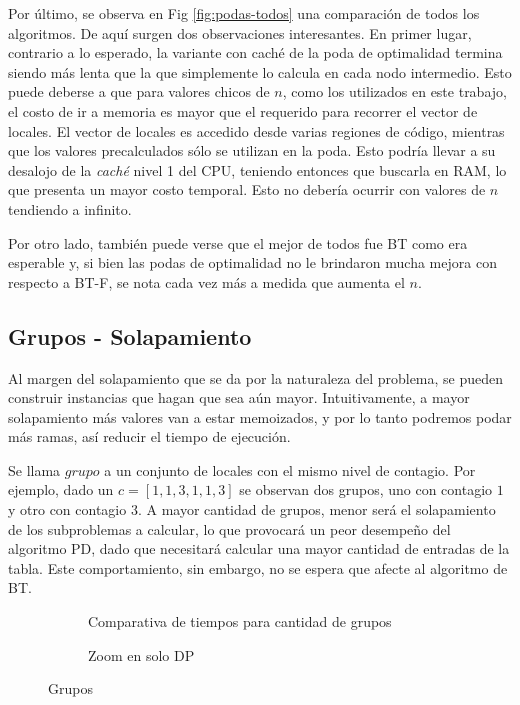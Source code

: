Por último, se observa en Fig \ref{fig:podas-todos} una comparación de todos los algoritmos. De aquí surgen dos observaciones interesantes. En primer lugar, contrario a lo esperado, la variante con caché de la poda de optimalidad termina siendo más lenta que la que simplemente lo calcula en cada nodo intermedio. Esto puede deberse a que para valores chicos de $n$, como los utilizados en este trabajo, el costo de ir a memoria es mayor que el requerido para recorrer el vector de locales. El vector de locales es accedido desde varias regiones de código, mientras que los valores precalculados sólo se utilizan en la poda. Esto podría llevar a su desalojo de la \textit{caché} nivel 1 del CPU, teniendo entonces que buscarla en RAM, lo que presenta un mayor costo temporal. Esto no debería ocurrir con valores de $n$ tendiendo a infinito. 

Por otro lado, también puede verse que el mejor de todos fue BT como era esperable y, si bien las podas de optimalidad no le brindaron mucha mejora con respecto a BT-F, se nota cada vez más a medida que aumenta el $n$.

\subsection{Grupos - Solapamiento}

Al margen del solapamiento que se da por la naturaleza del problema, se pueden construir instancias que hagan que sea aún mayor. Intuitivamente, a mayor solapamiento más valores van a estar memoizados, y por lo tanto podremos podar más ramas, así reducir el tiempo de ejecución.

Se llama $grupo$ a un conjunto de locales con el mismo nivel de contagio. Por ejemplo, dado un $c=[1,1,3,1,1,3]$ se observan dos grupos, uno con contagio $1$ y otro con contagio $3$. A mayor cantidad de grupos, menor será el solapamiento de los subproblemas a calcular, lo que provocará un peor desempeño del algoritmo PD, dado que necesitará calcular una mayor cantidad de entradas de la tabla. Este comportamiento, sin embargo, no se espera que afecte al algoritmo de BT.

\begin{figure}[H]
    \centering
    \begin{subfigure}[b]{0.45\textwidth}
        
        \caption{Comparativa de tiempos para cantidad de grupos}
    \end{subfigure}
    \begin{subfigure}[b]{0.45\textwidth}
        
        \caption{Zoom en solo DP}
    \end{subfigure}
    \caption{Grupos}
    \label{fig:grupos}
\end{figure}

